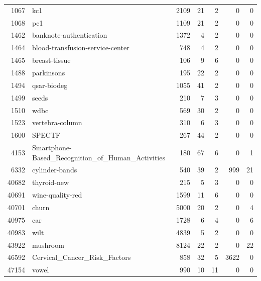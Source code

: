 \begin{tabular}{rlrrrr r}
1067 & kc1 & 2109 & 21 & 2 & 0 & 0 \\
1068 & pc1 & 1109 & 21 & 2 & 0 & 0 \\
1462 & banknote-authentication & 1372 & 4 & 2 & 0 & 0 \\
1464 & blood-transfusion-service-center & 748 & 4 & 2 & 0 & 0 \\
1465 & breast-tissue & 106 & 9 & 6 & 0 & 0 \\
1488 & parkinsons & 195 & 22 & 2 & 0 & 0 \\
1494 & qsar-biodeg & 1055 & 41 & 2 & 0 & 0 \\
1499 & seeds & 210 & 7 & 3 & 0 & 0 \\
1510 & wdbc & 569 & 30 & 2 & 0 & 0 \\
1523 & vertebra-column & 310 & 6 & 3 & 0 & 0 \\
1600 & SPECTF & 267 & 44 & 2 & 0 & 0 \\
4153 & Smartphone-Based\_Recognition\_of\_Human\_Activities & 180 & 67 & 6 & 0 & 1 \\
6332 & cylinder-bands & 540 & 39 & 2 & 999 & 21 \\
40682 & thyroid-new & 215 & 5 & 3 & 0 & 0 \\
40691 & wine-quality-red & 1599 & 11 & 6 & 0 & 0 \\
40701 & churn & 5000 & 20 & 2 & 0 & 4 \\
40975 & car & 1728 & 6 & 4 & 0 & 6 \\
40983 & wilt & 4839 & 5 & 2 & 0 & 0 \\
43922 & mushroom & 8124 & 22 & 2 & 0 & 22 \\
46592 & Cervical\_Cancer\_Risk\_Factors & 858 & 32 & 5 & 3622 & 0 \\
47154 & vowel & 990 & 10 & 11 & 0 & 0 \\
\bottomrule
\end{tabular}

